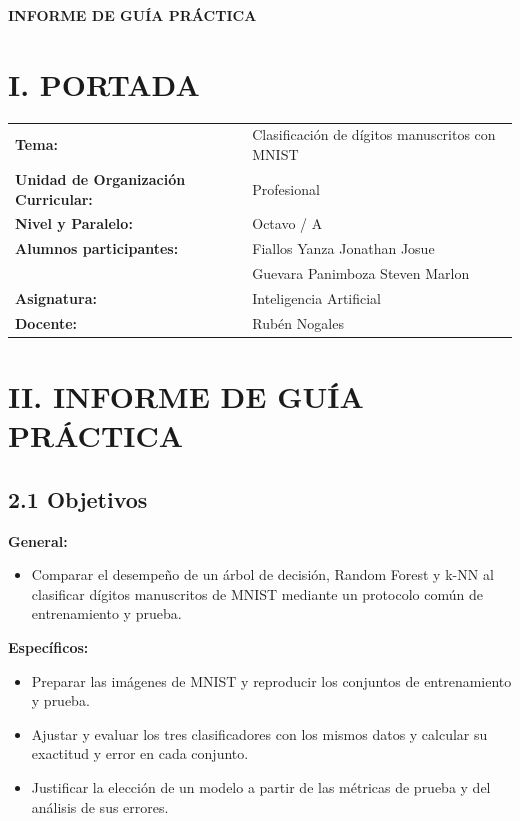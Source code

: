 \documentclass[11pt,a4paper]{article}
\begin{document}
\begin{center}
    {\Large \textbf{INFORME DE GUÍA PRÁCTICA}}\\[0.3cm]
\end{center}

\section*{I. PORTADA}
\vspace{0.1cm}
\noindent
\begin{tabularx}{\textwidth}{@{}p{6.8cm}X@{}}
\textbf{Tema:} & Clasificación de dígitos manuscritos con MNIST \\[6pt]
\textbf{Unidad de Organización Curricular:} & Profesional \\[6pt]
\textbf{Nivel y Paralelo:} & Octavo / A \\[6pt]
\textbf{Alumnos participantes:} & Fiallos Yanza Jonathan Josue \\
                                & Guevara Panimboza Steven Marlon \\[6pt]
\textbf{Asignatura:} & Inteligencia Artificial \\[6pt]
\textbf{Docente:} & Rubén Nogales \\
\end{tabularx}

\vspace{0.4cm}

\section*{II. INFORME DE GUÍA PRÁCTICA}

\subsection*{2.1 Objetivos}
\textbf{General:}
\begin{itemize}[leftmargin=*,noitemsep]
    \item Comparar el desempeño de un árbol de decisión, Random Forest y k-NN al clasificar dígitos manuscritos de MNIST mediante un protocolo común de entrenamiento y prueba.
\end{itemize}

\textbf{Específicos:}
\begin{itemize}[leftmargin=*,noitemsep]
    \item Preparar las imágenes de MNIST y reproducir los conjuntos de entrenamiento y prueba.
    \item Ajustar y evaluar los tres clasificadores con los mismos datos y calcular su exactitud y error en cada conjunto.
    \item Justificar la elección de un modelo a partir de las métricas de prueba y del análisis de sus errores.
\end{itemize}
\end{document}
